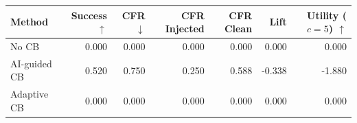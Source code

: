 \begin{tabular}{lrrrrrr}
\toprule
Method & Success $\uparrow$ & CFR $\downarrow$ & CFR Injected & CFR Clean & Lift & Utility ($c=5$) $\uparrow$ \\
\midrule
No CB & 0.000 & 0.000 & 0.000 & 0.000 & 0.000 & 0.000 \\
AI-guided CB & 0.520 & 0.750 & 0.250 & 0.588 & -0.338 & -1.880 \\
Adaptive CB & 0.000 & 0.000 & 0.000 & 0.000 & 0.000 & 0.000 \\
\bottomrule
\end{tabular}
